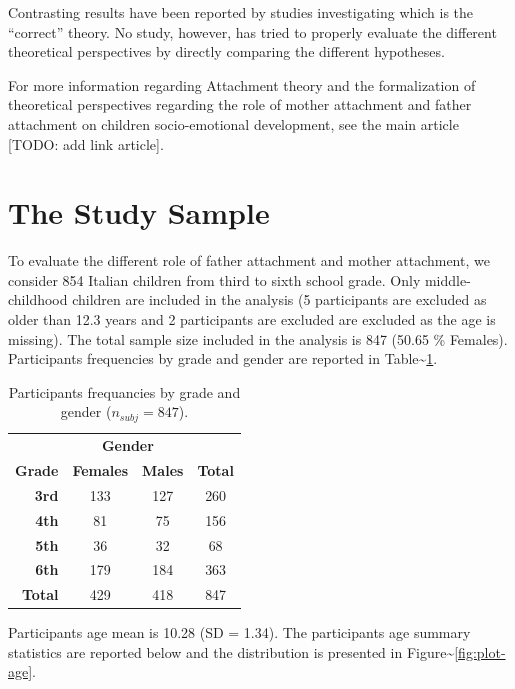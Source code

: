 \documentclass[
]{book}
\begin{document}
Contrasting results have been reported by studies investigating which is the ``correct'' theory. No study, however, has tried to properly evaluate the different theoretical perspectives by directly comparing the different hypotheses.

For more information regarding Attachment theory and the formalization of theoretical perspectives regarding the role of mother attachment and father attachment on children socio-emotional development, see the main article {[}TODO: add link article{]}.

\hypertarget{the-study-sample}{%
\section{The Study Sample}\label{the-study-sample}}

To evaluate the different role of father attachment and mother attachment, we consider 854 Italian children from third to sixth school grade. Only middle-childhood children are included in the analysis (5 participants are excluded as older than 12.3 years and 2 participants are excluded are excluded as the age is missing). The total sample size included in the analysis is 847 (50.65 \% Females). Participants frequencies by grade and gender are reported in Table\textasciitilde\ref{tab:table-gender-grade}.

\begin{table}[!h]

\caption{\label{tab:table-gender-grade}Participants frequancies by grade and gender ($n_{subj} = 847$).}
\centering
\begin{tabular}[t]{>{}rccc}
\toprule
\multicolumn{1}{c}{\textbf{ }} & \multicolumn{2}{c}{\textbf{Gender}} & \multicolumn{1}{c}{\textbf{ }} \\
\cmidrule(l{3pt}r{3pt}){2-3}
\textbf{Grade} & \textbf{Females} & \textbf{Males} & \textbf{Total}\\
\midrule
\textbf{3rd} & 133 & 127 & 260\\
\textbf{4th} & 81 & 75 & 156\\
\textbf{5th} & 36 & 32 & 68\\
\textbf{6th} & 179 & 184 & 363\\
\textbf{Total} & 429 & 418 & 847\\
\bottomrule
\end{tabular}
\end{table}

Participants age mean is 10.28 (SD = 1.34). The participants age summary statistics are reported below and the distribution is presented in Figure\textasciitilde\ref{fig:plot-age}.
\end{document}
